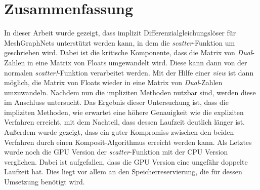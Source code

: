 
\section{Zusammenfassung}

In dieser Arbeit wurde gezeigt, dass implizit Differenzialgleichungslöser für MeshGraphNets 
unterstützt werden kann, in dem die \textit{scatter}-Funktion um geschrieben wird.
Dabei ist die kritische Komponente, dass die Matrix von \textit{Dual}-Zahlen in eine Matrix von Floats umgewandelt wird.
Diese kann dann von der normalen \textit{scatter!}-Funktion verarbeitet werden.
Mit der Hilfe einer \textit{view} ist dann möglich, die Matrix von Floats wieder in eine Matrix von \textit{Dual}-Zahlen
umzuwandeln.
Nachdem nun die impliziten Methoden nutzbar sind, werden diese im Anschluss untersucht.
Das Ergebnis dieser Untersuchung ist, dass die impliziten Methoden, wie erwartet eine höhere Genauigkeit
wie die expliziten Verfahren erreicht, mit dem Nachteil, dass dessen Laufzeit deutlich länger ist.
Außerdem wurde gezeigt, dass ein guter Kompromiss zwischen den beiden Verfahren durch einen Komposit-Algorithmus erreicht werden kann.
Als Letztes wurde noch die GPU Version der \textit{scatter}-Funktion mit der CPU Version verglichen.
Dabei ist aufgefallen, dass die GPU Version eine ungefähr doppelte Laufzeit hat.
Dies liegt vor allem an den Speicherreservierung, die für dessen Umsetzung benötigt wird.

